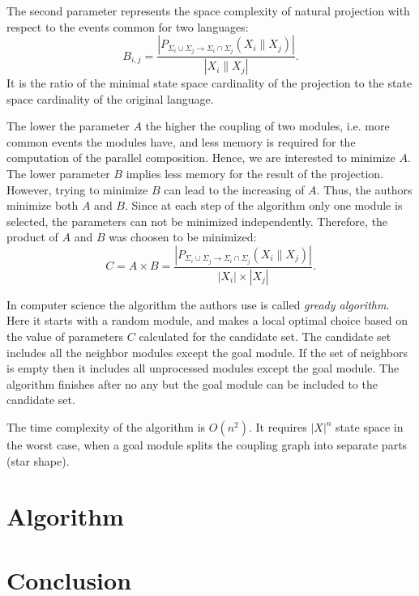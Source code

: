\documentclass[a4paper, 10pt, conference]{ieeeconf}
\begin{document}
The second parameter represents the space complexity of natural projection with
respect to the events common for two languages:
\begin{equation}
	B_{i,j} = \frac{
		| P_{\Sigma_i \cup \Sigma_j \rightarrow \Sigma_i \cap \Sigma_j}
		(X_i \parallel X_j) |}
		{| X_i \parallel X_j |}.
\end{equation}
It is the ratio of the minimal state space cardinality of the projection to the
state space cardinality of the original language.

The lower the parameter $A$ the higher the coupling of two modules, i.e. more
common events the modules have, and less memory is required for the computation
of the parallel composition. Hence, we are interested to minimize $A$. The lower
parameter $B$ implies less memory for the result of the projection. However,
trying to minimize $B$ can lead to the increasing of $A$. Thus, the authors
minimize both $A$ and $B$. Since at each step of the algorithm only one module is
selected, the parameters can not be minimized independently. Therefore, the
product of $A$ and $B$ was choosen to be minimized:
\begin{equation}
	C = A \times B = 
		\frac{| P_{\Sigma_i \cup \Sigma_j \rightarrow \Sigma_i \cap \Sigma_j}
		(X_i \parallel X_j) |}
		{|X_i|\times |X_j|}.
\end{equation}

In computer science the algorithm the authors use is called \emph{gready
algorithm}. Here it starts with a random module, and makes a local optimal
choice based on the value of parameters $C$ calculated for the candidate set.
The candidate set includes all the neighbor modules except the goal module. If
the set of neighbors is empty then it includes all unprocessed modules except
the goal module. The algorithm finishes after no any but the goal module can be
included to the candidate set.

The time complexity of the algorithm is $O(n^2)$. It requires $|X|^n$ state
space in the worst case, when a goal module splits the coupling graph into
separate parts (star shape). 


\section{Algorithm}
\label{sec:Algorithm}


\section{Conclusion}
\label{sec:Conclusion}




\end{document}
